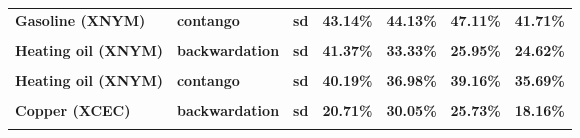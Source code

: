 \documentclass[
  authoryear,
  preprint,
  3p]{elsarticle}
\begin{document}
\begin{longtable}[t]{>{}l>{}l>{}l>{}r>{}r>{}r>{}r}
\textbf{Gasoline (XNYM)} & \textbf{contango} & \textbf{sd} & \textcolor[HTML]{4285f4}{\textbf{43.14\%}} & \textcolor[HTML]{4285f4}{\textbf{44.13\%}} & \textcolor[HTML]{4285f4}{\textbf{47.11\%}} & \textcolor[HTML]{4285f4}{\textbf{41.71\%}}\\
\textbf{\cellcolor{gray!10}{Heating oil (XNYM)}} & \textbf{\cellcolor{gray!10}{backwardation}} & \textbf{\cellcolor{gray!10}{mean}} & \textcolor[HTML]{4285f4}{\textbf{\cellcolor{gray!10}{36.32\%}}} & \textcolor[HTML]{4285f4}{\textbf{\cellcolor{gray!10}{29.41\%}}} & \textcolor[HTML]{4285f4}{\textbf{\cellcolor{gray!10}{25.56\%}}} & \textcolor[HTML]{4285f4}{\textbf{\cellcolor{gray!10}{15.16\%}}}\\
\textbf{Heating oil (XNYM)} & \textbf{backwardation} & \textbf{sd} & \textcolor[HTML]{4285f4}{\textbf{41.37\%}} & \textcolor[HTML]{4285f4}{\textbf{33.33\%}} & \textcolor[HTML]{4285f4}{\textbf{25.95\%}} & \textcolor[HTML]{4285f4}{\textbf{24.62\%}}\\
\textbf{\cellcolor{gray!10}{Heating oil (XNYM)}} & \textbf{\cellcolor{gray!10}{contango}} & \textbf{\cellcolor{gray!10}{mean}} & \textcolor[HTML]{4285f4}{\textbf{\cellcolor{gray!10}{-2.74\%}}} & \textcolor[HTML]{4285f4}{\textbf{\cellcolor{gray!10}{30.5\%}}} & \textcolor[HTML]{4285f4}{\textbf{\cellcolor{gray!10}{-10.77\%}}} & \textcolor[HTML]{4285f4}{\textbf{\cellcolor{gray!10}{-21.62\%}}}\\
\addlinespace
\textbf{Heating oil (XNYM)} & \textbf{contango} & \textbf{sd} & \textcolor[HTML]{4285f4}{\textbf{40.19\%}} & \textcolor[HTML]{4285f4}{\textbf{36.98\%}} & \textcolor[HTML]{4285f4}{\textbf{39.16\%}} & \textcolor[HTML]{4285f4}{\textbf{35.69\%}}\\
\textbf{\cellcolor{gray!10}{Copper (XCEC)}} & \textbf{\cellcolor{gray!10}{backwardation}} & \textbf{\cellcolor{gray!10}{mean}} & \textcolor[HTML]{4285f4}{\textbf{\cellcolor{gray!10}{3.14\%}}} & \textcolor[HTML]{4285f4}{\textbf{\cellcolor{gray!10}{22.17\%}}} & \textcolor[HTML]{4285f4}{\textbf{\cellcolor{gray!10}{16.53\%}}} & \textcolor[HTML]{4285f4}{\textbf{\cellcolor{gray!10}{12.1\%}}}\\
\textbf{Copper (XCEC)} & \textbf{backwardation} & \textbf{sd} & \textcolor[HTML]{4285f4}{\textbf{20.71\%}} & \textcolor[HTML]{4285f4}{\textbf{30.05\%}} & \textcolor[HTML]{4285f4}{\textbf{25.73\%}} & \textcolor[HTML]{4285f4}{\textbf{18.16\%}}\\
\textbf{\cellcolor{gray!10}{Copper (XCEC)}} & \textbf{\cellcolor{gray!10}{contango}} & \textbf{\cellcolor{gray!10}{mean}} & \textcolor[HTML]{4285f4}{\textbf{\cellcolor{gray!10}{-0.28\%}}} & \textcolor[HTML]{4285f4}{\textbf{\cellcolor{gray!10}{34.17\%}}} & \textcolor[HTML]{4285f4}{\textbf{\cellcolor{gray!10}{-3.46\%}}} & \textcolor[HTML]{4285f4}{\textbf{\cellcolor{gray!10}{-12.15\%}}}\\

\end{longtable}
\end{document}
